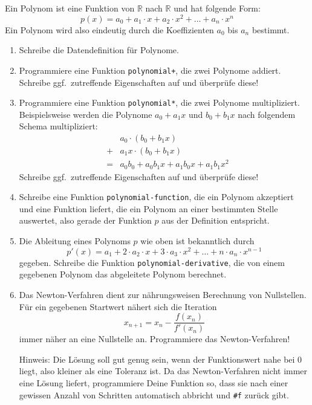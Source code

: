 \begin{aufgabe}
  Ein Polynom ist eine Funktion von $\mathbb{R}$ nach $\mathbb{R}$ und
  hat folgende Form:
  \begin{displaymath}
    p(x) = a_0 +
    a_1 \cdot x + a_2 \cdot x^2 + \ldots + a_n \cdot x^n    
  \end{displaymath}
  Ein Polynom wird also eindeutig durch die Koeffizienten $a_0$ bis
  $a_n$ bestimmt.

  \begin{enumerate}
   \item Schreibe die Datendefinition für Polynome.
   \item Programmiere eine Funktion \texttt{polynomial+}, die
     zwei Polynome addiert.  Schreibe ggf.\ zutreffende Eigenschaften auf
     und überprüfe diese!
     
   \item Programmiere eine Funktion \texttt{polynomial*}, die zwei Polynome 
     multipliziert. 
     Beispielsweise werden die Polynome $a_0+a_1 x$ und $b_0+b_1 x$ nach folgendem Schema multipliziert:
     \begin{eqnarray*}
     & &a_0 \cdot (b_0+b_1x) \\
     &+&a_1 x \cdot (b_0+b_1 x) \\ 
     &=&a_0b_0+a_0b_1 x + a_1b_0x + a_1b_1x^2
     \end{eqnarray*}	
     Schreibe ggf.\ zutreffende Eigenschaften auf und überprüfe diese!
   \item Schreibe eine Funktion \texttt{polynomial-function}, die
     ein Polynom akzeptiert und eine Funktion liefert, die ein Polynom
     an einer bestimmten Stelle auswertet, also gerade der Funktion
     $p$ aus der Definition entspricht. 
   \item Die Ableitung eines Polynoms $p$ wie oben ist bekanntlich durch
     \begin{displaymath}
       p'(x) = a_1 + 2\cdot a_2 \cdot x + 3\cdot a_3\cdot x^2 + \ldots
       + n \cdot a_n \cdot x^{n-1}
     \end{displaymath}
     gegeben. Schreibe die Funktion
     \texttt{polynomial-derivative}, die von einem gegebenen Polynom das abgeleitete Polynom
     berechnet.
   \item Das Newton-Verfahren dient zur nährungsweisen
     Berechnung von Nullstellen. Für ein gegebenen Startwert nähert sich die
     Iteration 
     \begin{displaymath}
       x_{n+1} = x_n - \frac{f(x_n)}{f'(x_n)}
     \end{displaymath}
     immer näher an eine Nullstelle an.
     Programmiere das Newton-Verfahren!

     Hinweis: Die Lösung soll gut genug sein, wenn der Funktionswert nahe
     bei 0 liegt, also kleiner als eine Toleranz ist. 
     Da das
     Newton-Verfahren nicht immer eine Lösung liefert, programmiere
     Deine Funktion so, dass sie nach einer gewissen Anzahl von Schritten
     automatisch abbricht und \verb|#f| zurück gibt.
 \end{enumerate}
\end{aufgabe}

